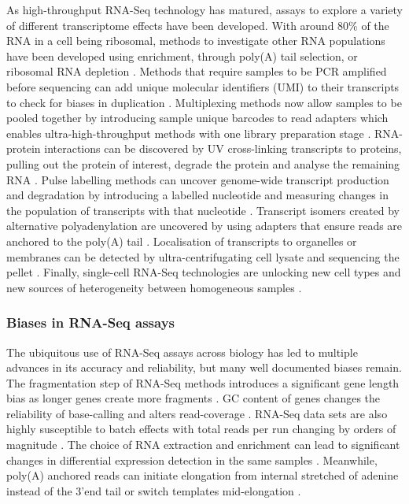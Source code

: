 \documentclass[../main.tex]{subfiles}
\begin{document}
As high-throughput RNA-Seq technology has matured, assays to explore a variety of different transcriptome effects have been developed.
With around 80\% of the RNA in a cell being ribosomal, methods to investigate other RNA populations have been developed using enrichment, through poly(A) tail selection, or ribosomal RNA depletion \parencite{Stark2019}. 
Methods that require samples to be PCR amplified before sequencing can add unique molecular identifiers (UMI) to their transcripts to check for biases in duplication \parencite{Kivioja2011}.
Multiplexing methods now allow samples to be pooled together by introducing sample unique barcodes to read adapters which enables ultra-high-throughput methods with one library preparation stage \parencite{Craig2008}.
RNA-protein interactions can be discovered by UV cross-linking transcripts to proteins, pulling out the protein of interest, degrade the protein and analyse the remaining RNA \parencite{Granneman2009}.
Pulse labelling methods can uncover genome-wide transcript production and degradation by introducing a labelled nucleotide and measuring changes in the population of transcripts with that nucleotide \parencite{Chan2018}.
Transcript isomers created by alternative polyadenylation are uncovered by using adapters that ensure reads are anchored to the poly(A) tail \parencite{Pelechano2013}. 
Localisation of transcripts to organelles or membranes can be detected by ultra-centrifugating cell lysate and sequencing the pellet \parencite{Iserman2020}.
Finally, single-cell RNA-Seq technologies are unlocking new cell types and new sources of heterogeneity between homogeneous samples \parencite{Jovic2022}.

\subsubsection{Biases in RNA-Seq assays}

The ubiquitous use of RNA-Seq assays across biology has led to multiple advances in its accuracy and reliability, but many well documented biases remain.
The fragmentation step of RNA-Seq methods introduces a significant gene length bias as longer genes create more fragments \parencite{Oshlack2009}.
GC content of genes changes the reliability of base-calling and alters read-coverage \parencite{Dohm2008}.
RNA-Seq data sets are also highly susceptible to batch effects with total reads per run changing by orders of magnitude \parencite{Auer2010}.
The choice of RNA extraction and enrichment can lead to significant changes in differential expression detection in the same samples \parencite{Sultan2014}.
Meanwhile, poly(A) anchored reads can initiate elongation from internal stretched of adenine instead of the 3'end tail or switch templates mid-elongation \parencite{Balazs2019}.
\end{document}
